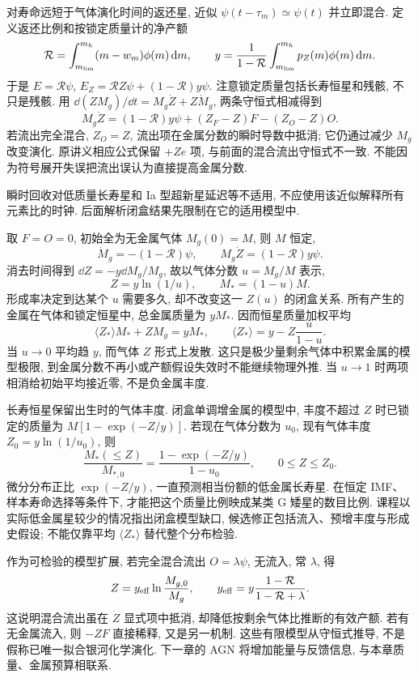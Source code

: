 对寿命远短于气体演化时间的返还星, 近似 $\psi(t-\tau_m)\simeq\psi(t)$ 并立即混合. 定义返还比例和按锁定质量计的净产额
\[
\mathcal R=\int_{m_{\rm lim}}^{m_h}(m-w_m)\phi(m)\,\mathrm d m,
\qquad y=\frac1{1-\mathcal R}\int_{m_{\rm lim}}^{m_h}p_Z(m)\phi(m)\,\mathrm d m.
\]
于是 $E=\mathcal R\psi$, $E_Z=\mathcal R Z\psi+(1-\mathcal R)y\psi$. 注意锁定质量包括长寿恒星和残骸, 不只是残骸. 用 $\dd(ZM_g)/\dd t=M_g\dot Z+Z\dot M_g$, 两条守恒式相减得到
\[
M_g\dot Z=(1-\mathcal R)y\psi+(Z_F-Z)F-(Z_O-Z)O.
\]
若流出完全混合, $Z_O=Z$, 流出项在金属分数的瞬时导数中抵消; 它仍通过减少 $M_g$ 改变演化. 原讲义相应公式保留 $+Ze$ 项, 与前面的混合流出守恒式不一致. 不能因为符号展开失误把流出误认为直接提高金属分数.

瞬时回收对低质量长寿星和 Ia 型超新星延迟等不适用, 不应使用该近似解释所有元素比的时钟. 后面解析闭盒结果先限制在它的适用模型中.

取 $F=O=0$, 初始全为无金属气体 $M_g(0)=M$, 则 $M$ 恒定,
\[
\dot M_g=-(1-\mathcal R)\psi,
\qquad M_g\dot Z=(1-\mathcal R)y\psi.
\]
消去时间得到 $\dd Z=-y\dd M_g/M_g$, 故以气体分数 $u=M_g/M$ 表示,
\[
Z=y\ln(1/u),\qquad M_*=(1-u)M.
\]
形成率决定到达某个 $u$ 需要多久, 却不改变这一 $Z(u)$ 的闭盒关系. 所有产生的金属在气体和锁定恒星中, 总金属质量为 $yM_*$. 因而恒星质量加权平均
\[
\langle Z_*\rangle M_*+ZM_g=yM_*,\qquad
\langle Z_*\rangle=y-Z\frac{u}{1-u}.
\]
当 $u\to0$ 平均趋 $y$, 而气体 $Z$ 形式上发散. 这只是极少量剩余气体中积累金属的模型极限, 到金属分数不再小或产额假设失效时不能继续物理外推. 当 $u\to1$ 时两项相消给初始平均接近零, 不是负金属丰度.

长寿恒星保留出生时的气体丰度. 闭盒单调增金属的模型中, 丰度不超过 $Z$ 时已锁定的质量为 $M[1-\exp(-Z/y)]$. 若现在气体分数为 $u_0$, 现有气体丰度 $Z_0=y\ln(1/u_0)$, 则
\[
\frac{M_*(\le Z)}{M_{*,0}}=
\frac{1-\exp(-Z/y)}{1-u_0},\qquad 0\le Z\le Z_0.
\]
微分分布正比 $\exp(-Z/y)$, 一直预测相当份额的低金属长寿星. 在恒定 IMF、样本寿命选择等条件下, 才能把这个质量比例映成某类 G 矮星的数目比例. 课程以实际低金属星较少的情况指出闭盒模型缺口, 候选修正包括流入、预增丰度与形成史假设; 不能仅靠平均 $\langle Z_*\rangle$ 替代整个分布检验.

作为可检验的模型扩展, 若完全混合流出 $O=\lambda\psi$, 无流入, 常 $\lambda$, 得
\[
Z=y_{\rm eff}\ln\frac{M_{g,0}}{M_g},\qquad
y_{\rm eff}=y\frac{1-\mathcal R}{1-\mathcal R+\lambda}.
\]
这说明混合流出虽在 $\dot Z$ 显式项中抵消, 却降低按剩余气体比推断的有效产额. 若有无金属流入, 则 $-ZF$ 直接稀释, 又是另一机制. 这些有限模型从守恒式推导, 不是假称已唯一拟合银河化学演化. 下一章的 AGN 将增加能量与反馈信息, 与本章质量、金属预算相联系.
